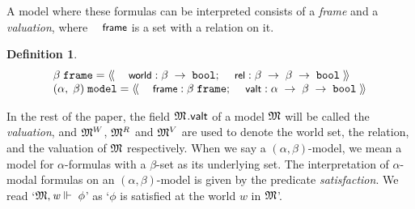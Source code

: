 \documentclass{llncs}
\newtheorem{defn}{Definition}[chapter]
\newenvironment{holmath}{\begin{displaymath}\begin{array}{l}}{\end{array}\end{displaymath}\ignorespacesafterend}
\renewcommand{\HOLConst}[1]{{\textsf{\upshape\small #1}}}
\renewcommand{\HOLinline}[1]{\ensuremath{#1}}
\renewcommand{\HOLFieldName}[1]{\HOLConst{#1}}
\renewcommand{\HOLTokenLeftrec}{\ensuremath{\langle\!\langle}}
\renewcommand{\HOLTokenRightrec}{\ensuremath{\rangle\!\rangle}}
\begin{document}
A model where these formulas can be interpreted consists of a \emph{frame} and a \emph{valuation}, where \HOLinline{\HOLConst{frame}} is a set with a relation on it. 
\begin{defn}
{\upshape\cite[Definition 1.19]{Blackburn}}
\begin{holmath}
  \ensuremath{\beta}\;\HOLTyOp{frame} = \HOLTokenLeftrec{}\;\HOLFieldName{world}\;{:}\;\ensuremath{\beta}\;\ensuremath{\rightarrow}\;\HOLTyOp{bool};\;\HOLFieldName{rel}\;{:}\;\ensuremath{\beta}\;\ensuremath{\rightarrow}\;\ensuremath{\beta}\;\ensuremath{\rightarrow}\;\HOLTyOp{bool}\;\HOLTokenRightrec{}\\
  (\ensuremath{\alpha},\;\ensuremath{\beta})\;\HOLTyOp{model} = \HOLTokenLeftrec{}\;\HOLFieldName{frame}\;{:}\;\ensuremath{\beta}\;\HOLTyOp{frame};\;\HOLFieldName{valt}\;{:}\;\ensuremath{\alpha}\;\ensuremath{\rightarrow}\;\ensuremath{\beta}\;\ensuremath{\rightarrow}\;\HOLTyOp{bool}\;\HOLTokenRightrec{}
\end{holmath}
\end{defn}
In the rest of the paper, the field \HOLinline{\HOLFreeVar{\ensuremath{\mathfrak{M}}}}$.\sf valt$ of a model \HOLinline{\HOLFreeVar{\ensuremath{\mathfrak{M}}}} will be called the \emph{valuation}, and \HOLinline{\HOLFreeVar{\ensuremath{\mathfrak{M}}}\HOLSymConst{\ensuremath{\sp{W}}}}, \HOLinline{\HOLFreeVar{\ensuremath{\mathfrak{M}}}\HOLSymConst{\ensuremath{\sp{R}}}} and \HOLinline{\HOLFreeVar{\ensuremath{\mathfrak{M}}}\HOLSymConst{\ensuremath{\sp{V}}}} are used to denote the world set, the relation, and the valuation of \HOLinline{\HOLFreeVar{\ensuremath{\mathfrak{M}}}} respectively.  When we say a $(\HOLinline{\ensuremath{\alpha}},\HOLinline{\ensuremath{\beta}})$-model, we mean a model for $\alpha$-formulas with a $\beta$-set as its underlying set. The interpretation of $\alpha$-modal formulas on an $(\HOLinline{\ensuremath{\alpha}},\HOLinline{\ensuremath{\beta}})$-model is given by the predicate \emph{satisfaction}. We read `\HOLinline{\HOLFreeVar{\ensuremath{\mathfrak{M}}},\HOLFreeVar{w}\ensuremath{\Vdash}\;\HOLFreeVar{\ensuremath{\phi}}}' as `$\phi$ is satisfied at the world $w$ in \HOLinline{\HOLFreeVar{\ensuremath{\mathfrak{M}}}}'.
\end{document}
